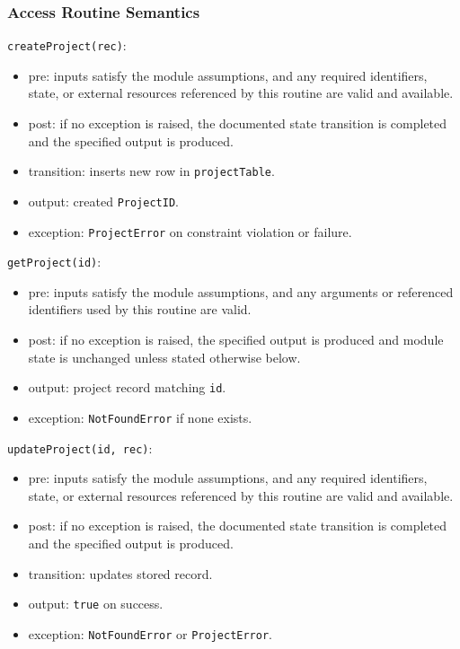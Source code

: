 \documentclass[12pt, titlepage]{article}
\begin{document}
\subsubsection{Access Routine Semantics}

\noindent \texttt{createProject(rec)}:
\begin{itemize}
    \item pre: inputs satisfy the module assumptions, and any required identifiers, state, or external resources referenced by this routine are valid and available.
    \item post: if no exception is raised, the documented state transition is completed and the specified output is produced.
    \item transition: inserts new row in \texttt{projectTable}.
    \item output: created \texttt{ProjectID}.
    \item exception: \texttt{ProjectError} on constraint violation or failure.
\end{itemize}

\noindent \texttt{getProject(id)}:
\begin{itemize}
    \item pre: inputs satisfy the module assumptions, and any arguments or referenced identifiers used by this routine are valid.
    \item post: if no exception is raised, the specified output is produced and module state is unchanged unless stated otherwise below.
    \item output: project record matching \texttt{id}.
    \item exception: \texttt{NotFoundError} if none exists.
\end{itemize}

\noindent \texttt{updateProject(id, rec)}:
\begin{itemize}
    \item pre: inputs satisfy the module assumptions, and any required identifiers, state, or external resources referenced by this routine are valid and available.
    \item post: if no exception is raised, the documented state transition is completed and the specified output is produced.
    \item transition: updates stored record.
    \item output: \texttt{true} on success.
    \item exception: \texttt{NotFoundError} or \texttt{ProjectError}.
\end{itemize}
\end{document}
